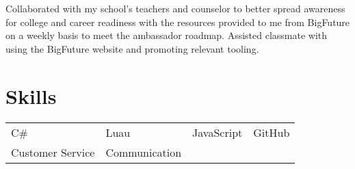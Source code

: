 \documentclass{my_cv}
\begin{document}
Collaborated with my school's teachers and counselor to better spread awareness for college and career readiness with the resources provided to me from BigFuture on a weekly basis to meet the ambassador roadmap. Assisted classmate with using the BigFuture website and promoting relevant tooling.

\section{Skills}
\begin{tabular}{l l l l}
C\# & Luau & JavaScript & GitHub \\
Customer Service & Communication
\end{tabular}
\end{document}
